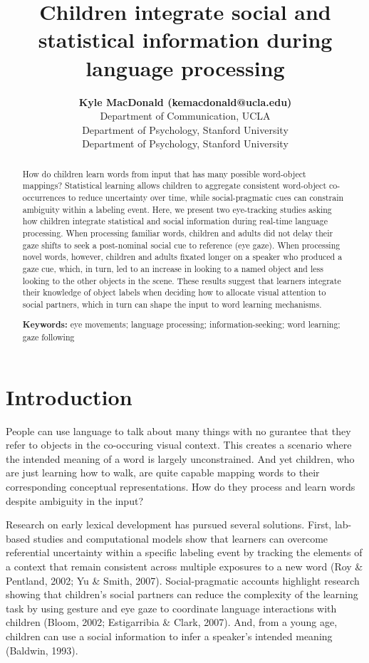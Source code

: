 \documentclass[10pt, letterpaper]{article}
\title{Children integrate social and statistical information during language
processing}
\author{{\large \bf Kyle MacDonald (kemacdonald@ucla.edu)} \\ Department of Communication, UCLA  \AND {\large \bf Elizabeth Swanson (elizswan@stanford.edu)} \\ Department of Psychology, Stanford University  \AND {\large \bf Michael C. Frank (mcfrank@stanford.edu)} \\ Department of Psychology, Stanford University  }
\begin{document}
\maketitle

\begin{abstract}
How do children learn words from input that has many possible
word-object mappings? Statistical learning allows children to aggregate
consistent word-object co-occurrences to reduce uncertainty over time,
while social-pragmatic cues can constrain ambiguity within a labeling
event. Here, we present two eye-tracking studies asking how children
integrate statistical and social information during real-time language
processing. When processing familiar words, children and adults did not
delay their gaze shifts to seek a post-nominal social cue to reference
(eye gaze). When processing novel words, however, children and adults
fixated longer on a speaker who produced a gaze cue, which, in turn, led
to an increase in looking to a named object and less looking to the
other objects in the scene. These results suggest that learners
integrate their knowledge of object labels when deciding how to allocate
visual attention to social partners, which in turn can shape the input
to word learning mechanisms.

\textbf{Keywords:}
eye movements; language processing; information-seeking; word learning;
gaze following
\end{abstract}

\hypertarget{introduction}{%
\section{Introduction}\label{introduction}}

People can use language to talk about many things with no gurantee that
they refer to objects in the co-occuring visual context. This creates a
scenario where the intended meaning of a word is largely unconstrained.
And yet children, who are just learning how to walk, are quite capable
mapping words to their corresponding conceptual representations. How do
they process and learn words despite ambiguity in the input?

Research on early lexical development has pursued several solutions.
First, lab-based studies and computational models show that learners can
overcome referential uncertainty within a specific labeling event by
tracking the elements of a context that remain consistent across
multiple exposures to a new word (Roy \& Pentland, 2002; Yu \& Smith,
2007). Social-pragmatic accounts highlight research showing that
children's social partners can reduce the complexity of the learning
task by using gesture and eye gaze to coordinate language interactions
with children (Bloom, 2002; Estigarribia \& Clark, 2007). And, from a
young age, children can use a social information to infer a speaker's
intended meaning (Baldwin, 1993).
\end{document}
